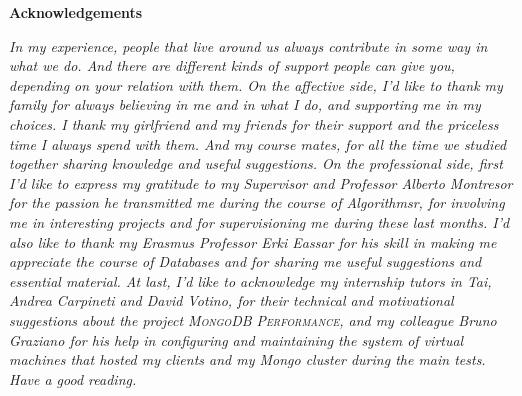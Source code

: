 \thispagestyle{empty}

\begin{center}
  {\bf \Huge Acknowledgements}
\end{center}

\vspace{4cm}


\emph{
 In my experience, people that live around us always contribute in some way in what we do. %
And there are different kinds of support people can give you, depending on your relation with them. 
On the affective side, I’d like to thank my family for always believing in me and in what I do, and supporting me in my choices.
I thank my girlfriend and my friends for their support and the priceless time I always spend with them. And my course mates, for all the time we studied together sharing knowledge and useful suggestions.
On the professional side, first I’d like to express my gratitude to my Supervisor and Professor Alberto Montresor for the passion he transmitted me during the course of Algorithmsr, for involving me in interesting projects and for supervisioning me during these last months.
I’d also like to thank my Erasmus Professor Erki Eassar for his skill in making me appreciate the course of Databases and for sharing me useful suggestions and essential material.
At last, I’d like to acknowledge my internship tutors in Tai, Andrea Carpineti and David Votino, for their technical and motivational suggestions about the project \textsc{MongoDB Performance}, and my colleague Bruno Graziano for his help in configuring and maintaining the system of virtual machines that hosted my clients and my Mongo cluster during the main tests. 
Have a good reading.
}


